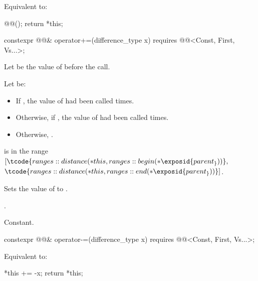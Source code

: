 \begin{itemdescr}
\pnum
\effects
Equivalent to:
\begin{codeblock}
@@();
return *this;
\end{codeblock}
\end{itemdescr}

%
\begin{itemdecl}
constexpr @@& operator+=(difference_type x)
  requires @@<Const, First, Vs...>;
\end{itemdecl}

\begin{itemdescr}
\pnum
Let  be the value of  before the call.

Let  be:
\begin{itemize}
\item
If ,
the value of  had  been called  times.
\item
Otherwise, if ,
the value of  had  been called  times.
\item
Otherwise, .
\end{itemize}

\pnum
\expects
{} is in the range
$[\tcode{ranges::distance(*this, ranges::begin(*\exposid{parent_}))},$\newline
$\tcode{ranges::distance(*this, ranges::end(*\exposid{parent_}))}]$.

\pnum
\effects
Sets the value of  to .

\pnum
\returns
{}.

\pnum
\complexity
Constant.
\end{itemdescr}

%
\begin{itemdecl}
constexpr @@& operator-=(difference_type x)
  requires @@<Const, First, Vs...>;
\end{itemdecl}

\begin{itemdescr}
\pnum
\effects
Equivalent to:
\begin{codeblock}
*this += -x;
return *this;
\end{codeblock}
\end{itemdescr}

